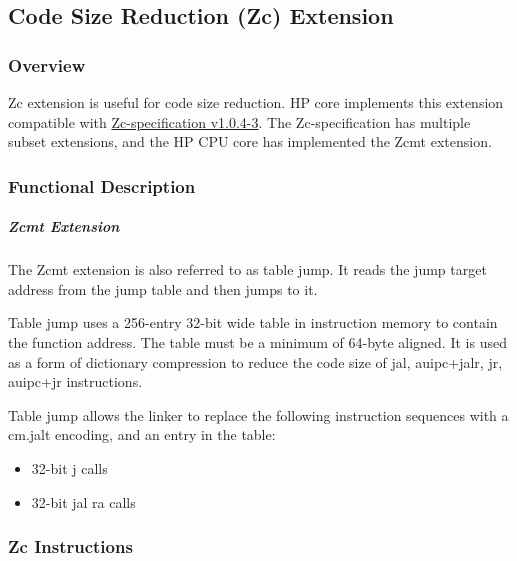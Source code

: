 \documentclass[main\_\_EN.tex]{subfiles}
\begin{document}
\newpage
\subsection{Code Size Reduction (Zc) Extension}
\label{sec:riscvcpu-zc}

\subsubsection{Overview}
\label{sec:riscvcpu-zc-overview}

Zc extension is useful for code size reduction. HP core implements this extension compatible with \href{https://github.com/riscvarchive/riscv-code-size-reduction/blob/v1.0.4-3/Zc-specification/Zc.adoc}{Zc-specification v1.0.4-3}. The Zc-specification has multiple subset extensions, and the \chipname HP CPU core has implemented the Zcmt extension.


\subsubsection{Functional Description}
\label{sec:riscvcpu-zc-func-descr}








\subparagraph{Zcmt Extension}

The Zcmt extension is also referred to as table jump. It reads the jump target address from the jump table and then jumps to it.

Table jump uses a 256-entry 32-bit wide table in instruction memory to contain the function address. The table must be a minimum of 64-byte aligned. It is used as a form of dictionary compression to reduce the code size of jal, auipc+jalr, jr, auipc+jr instructions.

Table jump allows the linker to replace the following instruction sequences with a cm.jalt encoding, and an entry in the table:
\begin{itemize}
    \item 32-bit j calls
    \item 32-bit jal ra calls
\end{itemize}

\subsubsection{Zc Instructions}
\label{sec:riscvcpu-zc-insn-descr}
\end{document}
